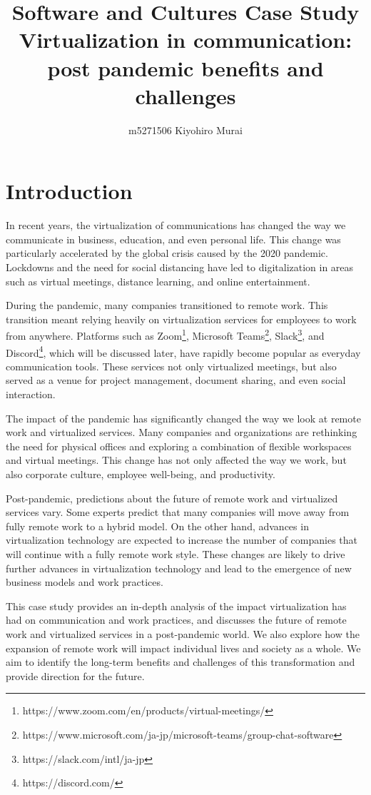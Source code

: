\documentclass[12pt]{article}
\title{Software and Cultures Case Study \\ \large Virtualization in
    communication: post pandemic benefits and challenges}
\author{m5271506 Kiyohiro Murai}
\date{}
\begin{document}
\maketitle
\tableofcontents
\newpage

\section{Introduction}
In recent years, the virtualization of communications has changed the way we
communicate in business, education, and even personal life. This change was
particularly accelerated by the global crisis caused by the 2020 pandemic.
Lockdowns and the need for social distancing have led to digitalization in
areas such as virtual meetings, distance learning, and online entertainment.

During the pandemic, many companies transitioned to remote work. This
transition meant relying heavily on virtualization services for employees to
work from anywhere. Platforms such as
Zoom\footnote{https://www.zoom.com/en/products/virtual-meetings/}, Microsoft
Teams\footnote{https://www.microsoft.com/ja-jp/microsoft-teams/group-chat-software},
Slack\footnote{https://slack.com/intl/ja-jp}, and
Discord\footnote{https://discord.com/}, which will be discussed later, have
rapidly become popular
as everyday
communication tools\cite{zoom_status, teams_status, slack_status,
    discord_status}. These services not only virtualized meetings, but also
served as a venue for project management, document sharing, and even social
interaction.

The impact of the pandemic has significantly changed the way we look at remote
work and virtualized services. Many companies and organizations are rethinking
the need for physical offices and exploring a combination of flexible
workspaces and virtual meetings. This change has not only affected the
way we work, but also corporate culture, employee well-being, and productivity.

Post-pandemic, predictions about the future of remote work and virtualized
services vary. Some experts predict that many companies will move away from
fully remote work to a hybrid model. On the other hand, advances in
virtualization technology are expected to increase the number of companies that
will continue with a fully remote work style. These changes are likely
to drive further advances in virtualization technology and lead to the
emergence of new business models and work practices.

This case study provides an in-depth analysis of the impact virtualization has
had
on communication and work practices, and discusses the future of remote work
and virtualized services in a post-pandemic world. We also explore how the
expansion of remote work will impact individual lives and society as a whole.
We aim to identify the long-term benefits and challenges of this transformation
and provide direction for the future.
\end{document}
